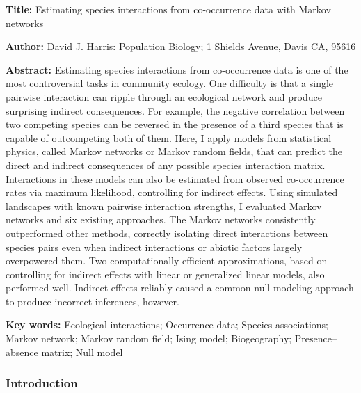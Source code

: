\documentclass[12pt,]{article}
\date{}
\begin{document}
\begin{spacing}{1.9}
\begin{flushleft}
\renewcommand{\headrulewidth}{0pt}

\setlength{\parskip}{1pt}

\textbf{Title:} Estimating species interactions from co-occurrence data
with Markov networks

\textbf{Author:} David J. Harris: Population Biology; 1 Shields Avenue,
Davis CA, 95616

\textbf{Abstract:} Estimating species interactions from co-occurrence
data is one of the most controversial tasks in community ecology. One
difficulty is that a single pairwise interaction can ripple through an
ecological network and produce surprising indirect consequences. For
example, the negative correlation between two competing species can be
reversed in the presence of a third species that is capable of
outcompeting both of them. Here, I apply models from statistical
physics, called Markov networks or Markov random fields, that can
predict the direct and indirect consequences of any possible species
interaction matrix. Interactions in these models can also be estimated
from observed co-occurrence rates via maximum likelihood, controlling
for indirect effects. Using simulated landscapes with known pairwise
interaction strengths, I evaluated Markov networks and six existing
approaches. The Markov networks consistently outperformed other methods,
correctly isolating direct interactions between species pairs even when
indirect interactions or abiotic factors largely overpowered them. Two
computationally efficient approximations, based on controlling for
indirect effects with linear or generalized linear models, also
performed well. Indirect effects reliably caused a common null modeling
approach to produce incorrect inferences, however.

\textbf{Key words:} Ecological interactions; Occurrence data; Species
associations; Markov network; Markov random field; Ising model;
Biogeography; Presence--absence matrix; Null model

\subsubsection{Introduction}\label{introduction}

\setlength{\parindent}{1cm}


\end{flushleft}
\end{spacing}
\end{document}

